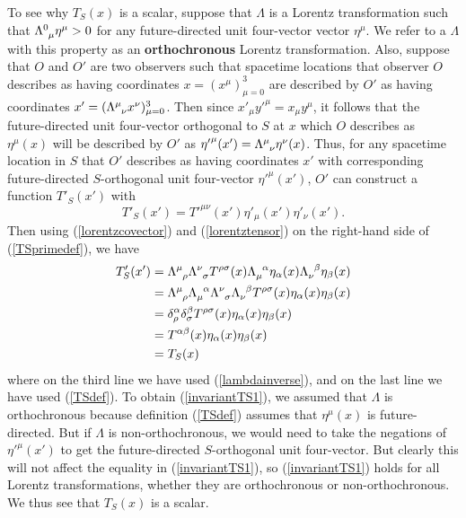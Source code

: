 To see why $T_S(x)$ is a scalar, suppose that $\Lambda$ is a Lorentz transformation such that $\Lambda\indices{^0_\mu}\eta^\mu>0$ for any future-directed  unit four-vector vector $\eta^\mu$. We refer to a $\Lambda$ with this property as an \textbf{orthochronous} Lorentz transformation. Also, suppose that $O$ and $O'$ are two observers such that spacetime locations that observer $O$ describes as having coordinates $x=(x^\mu)_{\mu=0}^3$ are described by $O'$ as having coordinates $x'=(\Lambda\indices{^\mu_\nu}x^\nu)_{\mu=0}^3$. Then since ${x'}_\mu{y'}^\mu= x_\mu y^\mu$, it follows that the future-directed unit four-vector orthogonal to $S$ at $x$ which $O$ describes as $\eta^\mu(x)$ will be described by $O'$ as  ${\eta'}^\mu(x')=\Lambda\indices{^\mu_\nu}\eta^\nu(x)$. Thus, for any spacetime location in $S$ that $O'$ describes as having coordinates $x'$ with corresponding  future-directed $S$-orthogonal unit four-vector ${\eta'}^\mu(x')$, $O'$ can construct a function $T'_S(x')$  with 
\begin{equation}\label{TSprimedef}
T'_S(x')=T'^{\mu\nu}(x')\eta'_{\mu}(x')\eta'_{\nu}(x').
\end{equation}
Then using  (\ref{lorentzcovector}) and (\ref{lorentztensor}) on the right-hand side of (\ref{TSprimedef}),  we have
\begin{equation}\label{invariantTS1}
\begin{split}
T'_S(x')&=\Lambda\indices{^\mu_\rho}\Lambda\indices{^\nu_\sigma}T^{\rho\sigma}(x)\Lambda\indices{_\mu^\alpha}\eta_{\alpha}(x)\Lambda\indices{_\nu^\beta}\eta_{\beta}(x)\\
&=\Lambda\indices{^\mu_\rho}\Lambda\indices{_\mu^\alpha} \Lambda\indices{^\nu_\sigma}\Lambda\indices{_\nu^\beta}T^{\rho\sigma}(x)\eta_{\alpha}(x)\eta_{\beta}(x)\\
&=\delta^\alpha_\rho\delta^\beta_\sigma T^{\rho\sigma}(x)\eta_{\alpha}(x)\eta_{\beta}(x)\\
&=T^{\alpha\beta}(x)\eta_{\alpha}(x)\eta_{\beta}(x)\\
&=T_S(x)
\end{split}
\end{equation}
where on the third line we have used (\ref{lambdainverse}), and on the last line we have used (\ref{TSdef}). To obtain (\ref{invariantTS1}), we assumed that $\Lambda$ is orthochronous because definition (\ref{TSdef}) assumes that $\eta^\mu(x)$ is future-directed. But if $\Lambda$ is non-orthochronous, we would need to take the negations of ${\eta'}^\mu(x')$ to get the future-directed $S$-orthogonal unit four-vector. But clearly this will not affect the equality in (\ref{invariantTS1}), so (\ref{invariantTS1}) holds for all Lorentz transformations, whether they are orthochronous or non-orthochronous.  We thus see that   $T_S(x)$ is a scalar.

